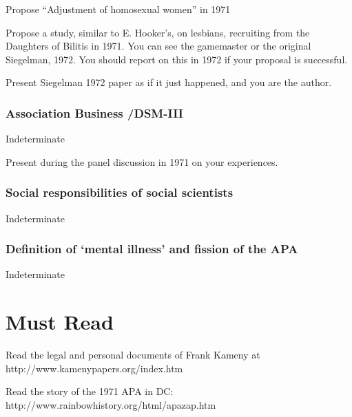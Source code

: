 \begin{refsection}
\begin{researchtask}[Gittings]\label{researchtask:gittings}
Propose “Adjustment of homosexual women” in 1971
\end{researchtask}

Propose a study, similar to E. Hooker’s, on lesbians, recruiting from the Daughters of Bilitis in 1971. You can see the gamemaster or the original Siegelman, 1972. You should report on this in 1972 if your proposal is successful.
\begin{writingtask}[Gittings]\label{writingtask2:gittings}
Present Siegelman 1972 paper as if it just happened, and you are the author.
\end{writingtask}

\subsubsection{Association Business \slash  DSM-III}
\label{associationbusinessdsm-iii}

Indeterminate\begin{writingtask}[Gittings]\label{writingtask:gittings}
Present during the panel discussion in 1971 on your experiences.
\end{writingtask}

\subsubsection{Social responsibilities of social scientists}
\label{socialresponsibilitiesofsocialscientists}

Indeterminate

\subsubsection{Definition of ‘mental illness’ and fission of the APA}
\label{definitionof‘mentalillness’andfissionoftheapa}

Indeterminate

\section{Must Read}
\label{mustread}

Read the legal and personal documents of Frank Kameny at http:\slash \slash www.kamenypapers.org\slash index.htm

Read the story of the 1971 APA in DC: http:\slash \slash www.rainbowhistory.org\slash html\slash apazap.htm


\end{refsection}
